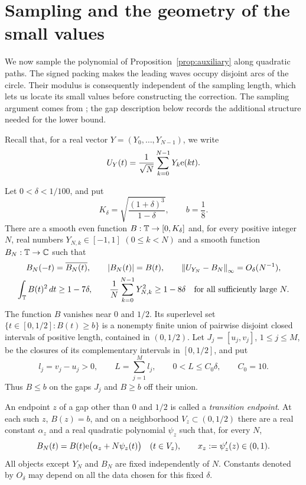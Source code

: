 \section{Sampling and the geometry of the small values}
\label{sec:sampling}

We now sample the polynomial of Proposition~\ref{prop:auxiliary} along
quadratic paths.  The signed packing makes the leading waves occupy
disjoint arcs of the circle.  Their modulus is consequently independent
of the sampling length, which lets us locate its small values before
constructing the correction.  The sampling argument comes from
\cite[Section~5]{OpenAIMinimal}; the gap description below records the
additional structure needed for the lower bound.

Recall that, for a real vector $Y=(Y_0,\ldots,Y_{N-1})$, we write
\[
 U_Y(t)=\frac1{\sqrt N}\sum_{k=0}^{N-1}Y_k\mathrm e(kt).
\]

\begin{proposition}
\label{prop:starting}
Let $0<\delta<1/100$, and put
\[
 K_\delta=\sqrt{\frac{(1+\delta)^3}{1-\delta}},
 \qquad b=\frac18.
\]
There are a smooth even function $B:\mathbb T\to[0,K_\delta]$ and, for every
positive integer $N$, real numbers $Y_{N,k}\in[-1,1]$ $(0\le k<N)$
and a smooth function $B_N:\mathbb T\to\mathbb C$ such that
\begin{gather}
 B_N(-t)=\overline{B_N(t)},\qquad |B_N(t)|=B(t),
 \qquad \left\lVert U_{Y_N}-B_N\right\rVert_\infty=O_\delta(N^{-1}),
 \label{eq:starting-approximation}\\
 \int_\mathbb T B(t)^2\,dt\ge1-7\delta,
 \qquad
 \frac1N\sum_{k=0}^{N-1}Y_{N,k}^2\ge1-8\delta
 \quad\text{for all sufficiently large }N.
 \label{eq:starting-mass}
\end{gather}
The function $B$ vanishes near $0$ and $1/2$.  Its superlevel set
$\{t\in[0,1/2]:B(t)\ge b\}$ is a nonempty finite union of pairwise
disjoint closed intervals of positive length, contained in $(0,1/2)$.
Let $J_j=[u_j,v_j]$, $1\le j\le M$, be the closures of its complementary
intervals in $[0,1/2]$, and put
\begin{equation}
 \label{eq:starting-gaps}
 l_j=v_j-u_j>0,\qquad
 L=\sum_{j=1}^M l_j,\qquad 0<L\le C_0\delta,
 \qquad C_0=10.
\end{equation}
Thus $B\le b$ on the gaps $J_j$ and $B\ge b$ off their union.

An endpoint $z$ of a gap other than $0$ and $1/2$ is called a
\emph{transition endpoint}.  At each such $z$, $B(z)=b$, and on a
neighborhood $V_z\subset(0,1/2)$ there are a real constant $\alpha_z$
and a real quadratic polynomial $\psi_z$ such that, for every $N$,
\begin{equation}
 \label{eq:starting-endpoint-phase}
 B_N(t)=B(t)\mathrm e\bigl(\alpha_z+N\psi_z(t)\bigr)
 \quad(t\in V_z),\qquad
 x_z:=\psi_z'(z)\in(0,1).
\end{equation}
All objects except $Y_N$ and $B_N$ are fixed independently of $N$.
Constants denoted by $O_\delta$ may depend on all the data chosen for
this fixed $\delta$.
\end{proposition}

